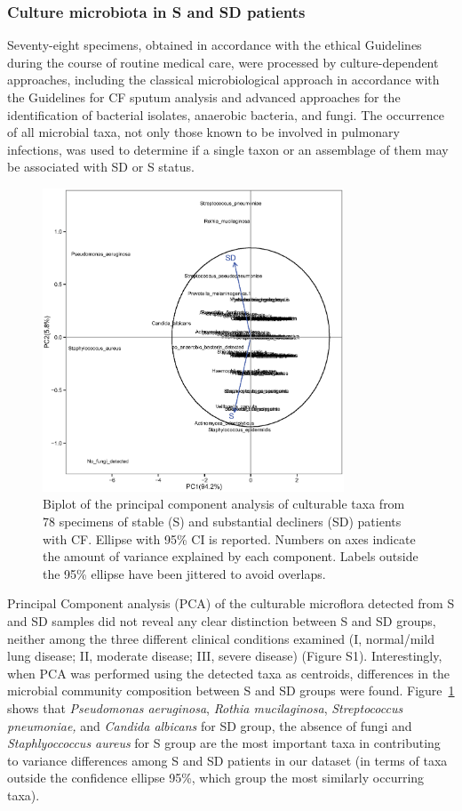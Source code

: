 \subsubsection{Culture microbiota in S and SD patients}
Seventy-eight specimens, obtained in accordance with the ethical Guidelines during the course of routine medical care, were processed by culture-dependent approaches, including the classical microbiological approach in accordance with the Guidelines for CF sputum analysis and advanced approaches for the identification of bacterial isolates, anaerobic bacteria, and fungi. The occurrence of all microbial taxa, not only those known to be involved in pulmonary infections, was used to determine if a single taxon or an assemblage of them may be associated with SD or S status.\\
\begin{figure}[!tb]
	\centering
	\includegraphics[width=0.8\textwidth]{./figures/Chapter_7/Figure_1_cond_taxa}
  	\caption{\label{fig:fig1condtaxa}Biplot of the principal component analysis of culturable taxa from 78 specimens of stable (S) and substantial decliners (SD) patients with CF. Ellipse with 95\% CI is reported. Numbers on axes indicate the amount of variance explained by each component. Labels outside the 95\% ellipse have been jittered to avoid overlaps.}
\end{figure}
Principal Component analysis (PCA) of the culturable microflora detected from S and SD samples did not reveal any clear distinction between S and SD groups, neither among the three different clinical conditions examined (I, normal/mild lung disease; II, moderate disease; III, severe disease) (Figure S1). Interestingly, when PCA was performed using the detected taxa as centroids, differences in the microbial community composition between S and SD groups were found. Figure~\ref{fig:fig1condtaxa} shows that \textit{Pseudomonas aeruginosa}, \textit{Rothia mucilaginosa}, \textit{Streptococcus pneumoniae, }and \textit{Candida albicans} for SD group, the absence of fungi and \textit{Staphlyoccoccus aureus} for S group are the most important taxa in contributing to variance differences among S and SD patients in our dataset (in terms of taxa outside the confidence ellipse 95\%, which group  the most similarly occurring taxa).\\

